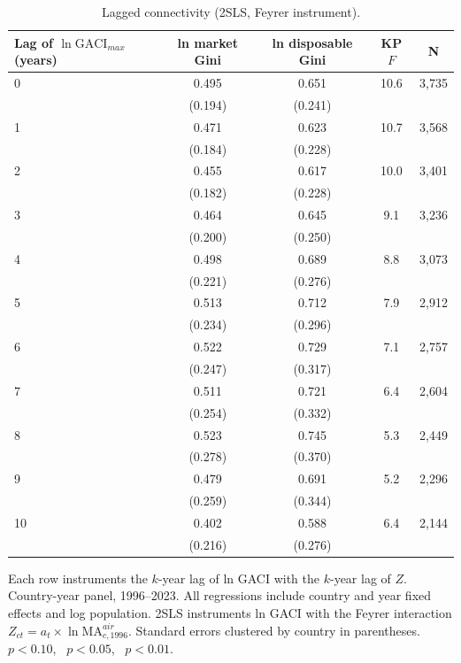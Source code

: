 \begin{table}[H]
\centering
\caption{Lagged connectivity (2SLS, Feyrer instrument).}
\label{tab:a_lags}
\begin{threeparttable}
\small
\begin{tabular}{lcccc}
\toprule
Lag of $\ln\mathrm{GACI}_{max}$ (years) & ln market Gini & ln disposable Gini & KP $F$ & N \\
\midrule
0 & 0.495\sym{**} & 0.651\sym{***} & 10.6 & 3{,}735 \\
 & (0.194) & (0.241) \\
1 & 0.471\sym{**} & 0.623\sym{***} & 10.7 & 3{,}568 \\
 & (0.184) & (0.228) \\
2 & 0.455\sym{**} & 0.617\sym{***} & 10.0 & 3{,}401 \\
 & (0.182) & (0.228) \\
3 & 0.464\sym{**} & 0.645\sym{**} & 9.1 & 3{,}236 \\
 & (0.200) & (0.250) \\
4 & 0.498\sym{**} & 0.689\sym{**} & 8.8 & 3{,}073 \\
 & (0.221) & (0.276) \\
5 & 0.513\sym{**} & 0.712\sym{**} & 7.9 & 2{,}912 \\
 & (0.234) & (0.296) \\
6 & 0.522\sym{**} & 0.729\sym{**} & 7.1 & 2{,}757 \\
 & (0.247) & (0.317) \\
7 & 0.511\sym{**} & 0.721\sym{**} & 6.4 & 2{,}604 \\
 & (0.254) & (0.332) \\
8 & 0.523\sym{*} & 0.745\sym{**} & 5.3 & 2{,}449 \\
 & (0.278) & (0.370) \\
9 & 0.479\sym{*} & 0.691\sym{**} & 5.2 & 2{,}296 \\
 & (0.259) & (0.344) \\
10 & 0.402\sym{*} & 0.588\sym{**} & 6.4 & 2{,}144 \\
 & (0.216) & (0.276) \\
\bottomrule
\end{tabular}
\begin{tablenotes}\small
\item Each row instruments the $k$-year lag of ln GACI with the $k$-year lag of $Z$. Country-year panel, 1996--2023. All regressions include country and year fixed effects and log population. 2SLS instruments ln GACI with the Feyrer interaction $Z_{ct}=a_t\times\ln \mathrm{MA}^{air}_{c,1996}$. Standard errors clustered by country in parentheses. \sym{*}~$p<0.10$, \sym{**}~$p<0.05$, \sym{***}~$p<0.01$.
\end{tablenotes}
\end{threeparttable}
\end{table}
